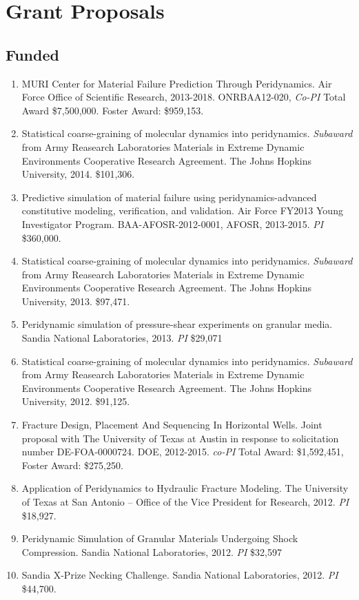 \section*{Grant Proposals}

\subsection*{Funded}

\begin{enumerate}
  \item MURI Center for Material Failure Prediction Through Peridynamics. Air Force Office of Scientific Research, 2013-2018. ONRBAA12-020, \textit{Co-PI} Total Award {\$}7,500,000.  Foster Award: \$959,153.
  \item Statistical coarse-graining of molecular dynamics into peridynamics. \textit{Subaward} from Army Reasearch Laboratories Materials in Extreme Dynamic Environments Cooperative Research Agreement.  The Johns Hopkins University, 2014.  \$101,306.
  \item Predictive simulation of material failure using peridynamics-advanced constitutive modeling, verification, and validation. Air Force FY2013 Young Investigator Program. BAA-AFOSR-2012-0001, AFOSR, 2013-2015. \textit{PI} \$360,000.
  \item Statistical coarse-graining of molecular dynamics into peridynamics. \textit{Subaward} from Army Reasearch Laboratories Materials in Extreme Dynamic Environments Cooperative Research Agreement.  The Johns Hopkins University, 2013.  \$97,471.
  \item Peridynamic simulation of pressure-shear experiments on granular media.  Sandia National Laboratories, 2013. \textit{PI} \$29,071
  \item Statistical coarse-graining of molecular dynamics into peridynamics. \textit{Subaward} from Army Reasearch Laboratories Materials in Extreme Dynamic Environments Cooperative Research Agreement.  The Johns Hopkins University, 2012.  \$91,125.
  \item Fracture Design, Placement And Sequencing In Horizontal Wells. Joint proposal with The University of Texas at Austin in response to solicitation number DE-FOA-0000724.  DOE, 2012-2015. \textit{co-PI} Total Award: {\$1,592,451}, Foster Award: \$275,250.
  \item Application of Peridynamics to Hydraulic Fracture Modeling. The University of Texas at San Antonio -- Office of the Vice President for Research, 2012. \textit{PI} \$18,927.
  \item Peridynamic Simulation of Granular Materials Undergoing Shock Compression.  Sandia National Laboratories, 2012. \textit{PI} \$32,597
  \item Sandia X-Prize Necking Challenge.  Sandia National Laboratories, 2012. \textit{PI} \$44,700.
\end{enumerate}

